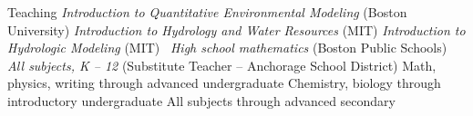 \begin{rubric}{Teaching}
%
\entry*[2015]%
	\emph{Introduction to Quantitative Environmental Modeling} (Boston University)
%
%
\entry*[2016 -- 2018]%
	\emph{Introduction to Hydrology and Water Resources} (MIT)
%
\entry*[2017]%
	\emph{Introduction to Hydrologic Modeling} (MIT)
\entry*[2010 -- 2011]\
    \emph{High school mathematics} (Boston Public Schools)
%
\entry*[2004 -- 2006]
    \emph{All subjects, K -- 12} (Substitute Teacher -- Anchorage School District)
%
%
\entry*[2002 -- 2010]
    Math, physics, writing through advanced undergraduate
\entry*[2006 -- 2010]
    Chemistry, biology through introductory undergraduate
\entry*[2006 -- 2010]
    All subjects through advanced secondary
%
%
\end{rubric}




